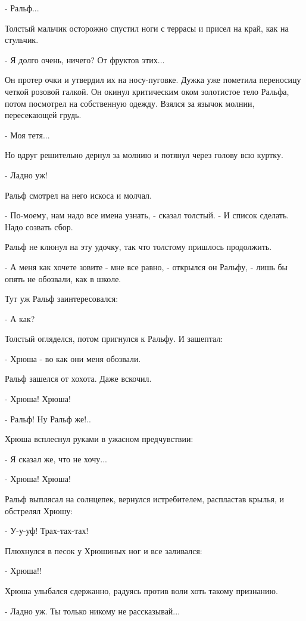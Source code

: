 \documentclass[12pt]{article}
\begin{document}
    - Ральф...

    Толстый  мальчик осторожно спустил ноги с террасы и присел на край, как
на стульчик.

    - Я долго очень, ничего? От фруктов этих...

    Он протер очки и  утвердил  их  на  носу-пуговке.  Дужка  уже  пометила
переносицу четкой розовой галкой. Он окинул критическим оком золотистое тело
Ральфа,  потом  посмотрел  на  собственную  одежду. Взялся за язычок молнии,
пересекающей грудь.

    - Моя тетя...

    Но вдруг решительно дернул за молнию и потянул через голову всю куртку.

    - Ладно уж!

    Ральф смотрел на него искоса и молчал.

    - По-моему, нам надо все имена узнать, - сказал  толстый.  -  И  список
сделать. Надо созвать сбор.

    Ральф не клюнул на эту удочку, так что толстому пришлось продолжить.

    - А  меня  как  хочете  зовите - мне все равно, - открылся он Ральфу, -
лишь бы опять не обозвали, как в школе.

    Тут уж Ральф заинтересовался:

    - А как?

    Толстый огляделся, потом пригнулся к Ральфу. И зашептал:

    - Хрюша - во как они меня обозвали.

    Ральф зашелся от хохота. Даже вскочил.

    - Хрюша! Хрюша!

    - Ральф! Ну Ральф же!..

    Хрюша всплеснул руками в ужасном предчувствии:

    - Я сказал же, что не хочу...

    - Хрюша! Хрюша!

    Ральф выплясал на солнцепек, вернулся истребителем, распластав  крылья,
и обстрелял Хрюшу:

    - У-у-уф! Трах-тах-тах!

    Плюхнулся в песок у Хрюшиных ног и все заливался:

    - Хрюша!!

    Хрюша улыбался сдержанно, радуясь против воли хоть такому признанию.

    - Ладно уж. Ты только никому не рассказывай...
\end{document}
